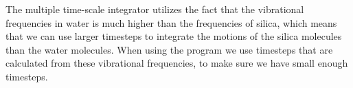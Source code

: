The multiple time-scale integrator utilizes the fact that the vibrational frequencies in water is much higher than the frequencies of silica, which means that we can use larger timesteps to integrate the motions of the silica molecules than the water molecules. When using the program we use timesteps that are calculated from these vibrational frequencies, to make sure we have small enough timesteps.%


